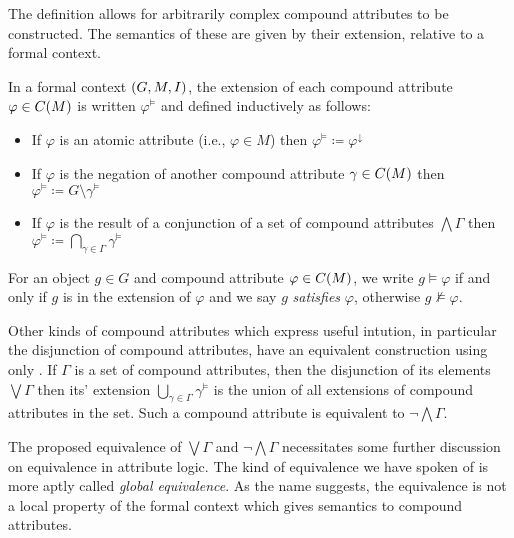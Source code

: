 The definition allows for arbitrarily complex compound attributes to be constructed. The semantics of these are given by
their extension, relative to a formal context.

\begin{definition}
	\label{definition:compound-attributes-semantics} 

	In a formal context $(G,M,\mathrel{I})$, the extension of each compound attribute $\varphi \in C(M)$ is written $\varphi^{\vDash}$
	and defined inductively as follows: 
	\begin{itemize}[itemsep=-0em]
		\item If $\varphi$ is an atomic attribute (i.e., $\varphi \in M$) then $\varphi^{\vDash}\coloneq \varphi^{\downarrow}$

		\item If $\varphi$ is the negation of another compound attribute $\gamma \in C(M)$ then $\varphi^{\vDash}\coloneq G
			\setminus \gamma^{\vDash}$

		\item If $\varphi$ is the result of a conjunction of a set of compound attributes $\bigwedge \Gamma$ then $\varphi^{\vDash}
			\coloneq \underset{\gamma \in \Gamma}\bigcap \gamma^{\vDash}$
	\end{itemize}
	For an object $g\in G$ and compound attribute $\varphi \in C(M)$, we write $g \vDash \varphi$ if and only if $g$ is
	in the extension of $\varphi$ and we say $g$ \emph{satisfies} $\varphi$, otherwise $g \nvDash \varphi$.
\end{definition}

Other kinds of compound attributes which express useful intution, in particular the disjunction of compound attributes,
have an equivalent construction using only . If $\Gamma$ is a set of compound attributes,
then the disjunction of its elements $\bigvee \Gamma$ then its' extension $\bigcup_{\gamma \in \Gamma}\gamma^{\vDash}$ is
the union of all extensions of compound attributes in the set. Such a compound attribute is equivalent to
$\neg \bigwedge \Gamma$.

The proposed equivalence of $\bigvee \Gamma$ and $\neg \bigwedge \Gamma$ necessitates some further discussion on
equivalence in attribute logic. The kind of equivalence we have spoken of is more aptly called \textit{global
equivalence}. As the name suggests, the equivalence is not a local property of the formal context which gives semantics
to compound attributes.

